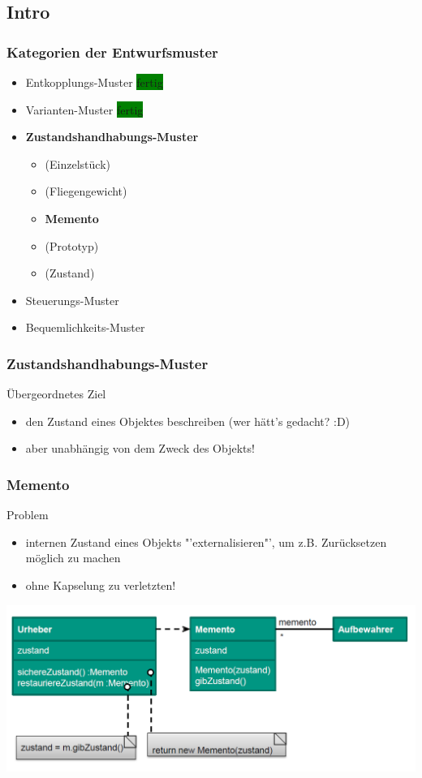 \documentclass[18pt]{beamer}
\begin{document}
	\subsection{Intro}
	\begin{frame}
		\frametitle{Kategorien der Entwurfsmuster}
		\begin{itemize}
			\item Entkopplungs-Muster \colorbox{green}{fertig}
			\item Varianten-Muster \colorbox{green}{fertig}
			\item \textbf{Zustandshandhabungs-Muster}
				\begin{itemize}
					\item (Einzelstück)
					\item (Fliegengewicht)
					\item \textbf{Memento} 
					\item (Prototyp) 
					\item (Zustand)
				\end{itemize}
			\item Steuerungs-Muster
			\item Bequemlichkeits-Muster
		\end{itemize}
	\end{frame}

	\begin{frame}
		\frametitle{Zustandshandhabungs-Muster}
		\begin{block}{Übergeordnetes Ziel}
			\begin{itemize}
				\item den Zustand eines Objektes beschreiben (wer hätt's gedacht? :D) \pause 
				\item aber unabhängig von dem Zweck des Objekts!
			\end{itemize}
		\end{block}
	\end{frame}

	\begin{frame}
		\frametitle{Memento}
		\begin{block}{Problem}
			\begin{itemize}
				\item internen Zustand eines Objekts "'externalisieren"', um z.B. Zurücksetzen möglich zu machen \pause 
				\item ohne Kapselung zu verletzten!
			\end{itemize}
		\end{block}
		\pause
		\centering
		\includegraphics[scale=0.4]{./pics/tut4/mem.png}
	\end{frame}
\end{document}
